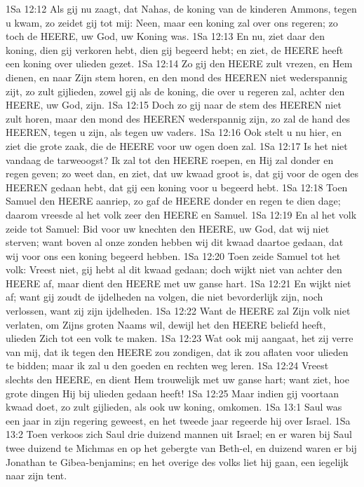 1Sa 12:12  Als gij nu zaagt, dat Nahas, de koning van de kinderen Ammons, tegen u kwam, zo zeidet gij tot mij: Neen, maar een koning zal over ons regeren; zo toch de HEERE, uw God, uw Koning was.
1Sa 12:13  En nu, ziet daar den koning, dien gij verkoren hebt, dien gij begeerd hebt; en ziet, de HEERE heeft een koning over ulieden gezet.
1Sa 12:14  Zo gij den HEERE zult vrezen, en Hem dienen, en naar Zijn stem horen, en den mond des HEEREN niet wederspannig zijt, zo zult gijlieden, zowel gij als de koning, die over u regeren zal, achter den HEERE, uw God, zijn.
1Sa 12:15  Doch zo gij naar de stem des HEEREN niet zult horen, maar den mond des HEEREN wederspannig zijn, zo zal de hand des HEEREN, tegen u zijn, als tegen uw vaders.
1Sa 12:16  Ook stelt u nu hier, en ziet die grote zaak, die de HEERE voor uw ogen doen zal.
1Sa 12:17  Is het niet vandaag de tarweoogst? Ik zal tot den HEERE roepen, en Hij zal donder en regen geven; zo weet dan, en ziet, dat uw kwaad groot is, dat gij voor de ogen des HEEREN gedaan hebt, dat gij een koning voor u begeerd hebt.
1Sa 12:18  Toen Samuel den HEERE aanriep, zo gaf de HEERE donder en regen te dien dage; daarom vreesde al het volk zeer den HEERE en Samuel.
1Sa 12:19  En al het volk zeide tot Samuel: Bid voor uw knechten den HEERE, uw God, dat wij niet sterven; want boven al onze zonden hebben wij dit kwaad daartoe gedaan, dat wij voor ons een koning begeerd hebben.
1Sa 12:20  Toen zeide Samuel tot het volk: Vreest niet, gij hebt al dit kwaad gedaan; doch wijkt niet van achter den HEERE af, maar dient den HEERE met uw ganse hart.
1Sa 12:21  En wijkt niet af; want gij zoudt de ijdelheden na volgen, die niet bevorderlijk zijn, noch verlossen, want zij zijn ijdelheden.
1Sa 12:22  Want de HEERE zal Zijn volk niet verlaten, om Zijns groten Naams wil, dewijl het den HEERE beliefd heeft, ulieden Zich tot een volk te maken.
1Sa 12:23  Wat ook mij aangaat, het zij verre van mij, dat ik tegen den HEERE zou zondigen, dat ik zou aflaten voor ulieden te bidden; maar ik zal u den goeden en rechten weg leren.
1Sa 12:24  Vreest slechts den HEERE, en dient Hem trouwelijk met uw ganse hart; want ziet, hoe grote dingen Hij bij ulieden gedaan heeft!
1Sa 12:25  Maar indien gij voortaan kwaad doet, zo zult gijlieden, als ook uw koning, omkomen.
1Sa 13:1  Saul was een jaar in zijn regering geweest, en het tweede jaar regeerde hij over Israel.
1Sa 13:2  Toen verkoos zich Saul drie duizend mannen uit Israel; en er waren bij Saul twee duizend te Michmas en op het gebergte van Beth-el, en duizend waren er bij Jonathan te Gibea-benjamins; en het overige des volks liet hij gaan, een iegelijk naar zijn tent.
